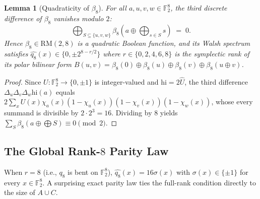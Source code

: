 \documentclass[11pt]{article}
\newtheorem{lemma}[theorem]{Lemma}
\theoremstyle{definition}
\newcommand{\F}{\mathbb{F}}
\begin{document}
\begin{lemma}[Quadraticity of $\beta_8$]
\label{lem:beta8-cube}
For all $a, u, v, w \in \F_2^8$, the third discrete difference of $\beta_8$ vanishes modulo $2$:
\[
  \bigoplus_{S \subseteq \{u, v, w\}} \beta_8\!\left(a \oplus \bigoplus_{s \in S} s\right) \;=\; 0.
\]
Hence $\beta_8 \in \mathrm{RM}(2, 8)$ is a quadratic Boolean function, and its Walsh spectrum satisfies $\widehat{q_8}(x) \in \{0, \pm 2^{8 - r/2}\}$ where $r \in \{0, 2, 4, 6, 8\}$ is the symplectic rank of its polar bilinear form $B(u, v) = \beta_8(0) \oplus \beta_8(u) \oplus \beta_8(v) \oplus \beta_8(u \oplus v)$.
\end{lemma}
\begin{proof}
Since $U : \F_2^8 \to \{0, \pm 1\}$ is integer-valued and $\mathrm{hi} = 2\widehat{U}$, the third difference $\Delta_u \Delta_v \Delta_w \mathrm{hi}(a)$ equals $2 \sum_x U(x)\chi_a(x)(1-\chi_u(x))(1-\chi_v(x))(1-\chi_w(x))$, whose every summand is divisible by $2 \cdot 2^3 = 16$. Dividing by $8$ yields $\sum_{S} \beta_8(a \oplus \bigoplus S) \equiv 0 \pmod 2$.
\end{proof}

\subsection{The Global Rank-$8$ Parity Law}

When $r = 8$ (i.e., $q_8$ is bent on $\F_2^8$), $\widehat{q_8}(x) = 16\sigma(x)$ with $\sigma(x) \in \{\pm 1\}$ for every $x \in \F_2^8$.
A surprising exact parity law ties the full-rank condition directly to the size of $A \cup C$.
\end{document}
